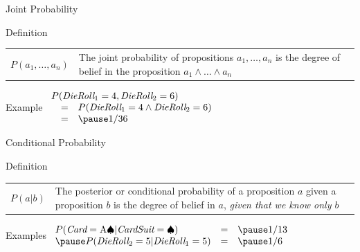 \documentclass[14pt]{beamer}
\begin{document}
\begin{frame}{Joint Probability}
\begin{block}{Definition}
\begin{tabular}{lm{2.75in}}
\large $P(a_1, \ldots, a_n)$
&
The \alert{joint probability} of propositions $a_1, \ldots, a_n$ is the degree of belief in the proposition $a_1 \land \ldots \land a_n$
\end{tabular}
\end{block}
\pause
\begin{block}{Example}
$
\begin{array}{lll}
\lefteqn{P(\textit{DieRoll}_1 = 4, \textit{DieRoll}_2 = 6)} \\
& = & P(\textit{DieRoll}_1 = 4 \land \textit{DieRoll}_2 = 6) \\
& = & \pause 1/36 \\
\end{array}
$
\end{block}
\end{frame}

\begin{frame}{Conditional Probability}
\begin{block}{Definition}
\begin{tabular}{lm{3.4in}@{}}
\large $P(a|b)$
&
The \alert{posterior} or \alert{conditional probability} of a proposition $a$ given a proposition $b$ is the degree of belief in $a$, \emph{given that we know only $b$}
\end{tabular}
\end{block}
\pause
\begin{block}{Examples}
$
\begin{array}{lll}
P(\textit{Card} = \mbox{A}\spadesuit|\textit{CardSuit} = \spadesuit) & = & \pause 1/13 \\
\pause
P(\textit{DieRoll}_2 = 5|\textit{DieRoll}_1 = 5) & = & \pause 1/6 \\
\end{array}
$
\end{block}
\end{frame}
\end{document}
